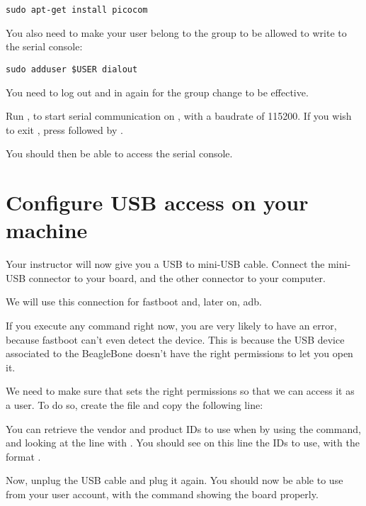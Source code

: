 \begin{verbatim}
sudo apt-get install picocom
\end{verbatim}

You also need to make your user belong to the  group to be
allowed to write to the serial console:

\begin{verbatim}
sudo adduser $USER dialout
\end{verbatim}

You need to log out and in again for the group change to be effective.

Run , to start serial
communication on , with a baudrate of 115200. If
you wish to exit , press \code{[Ctrl][a]} followed by
\code{[Ctrl][x]}.

You should then be able to access the serial console.

\section{Configure USB access on your machine}

Your instructor will now give you a USB to mini-USB cable. Connect
the mini-USB connector to your board, and the other connector to your
computer.

We will use this connection for fastboot and, later on, adb.

If you execute any command right now, you are very likely to have an
error, because fastboot can't even detect the device. This is because
the USB device associated to the BeagleBone doesn't have the right
permissions to let you open it.

We need to make sure that  sets the right permissions so
that we can access it as a user. To do so, create the file
 and copy the following line:


You can retrieve the vendor and product IDs to use when by using the
 command, and looking at the line with . You should see on this line the IDs to use, with the format
.

Now, unplug the USB cable and plug it again. You should now be able to
use  from your user account, with the command
 showing the board properly.

